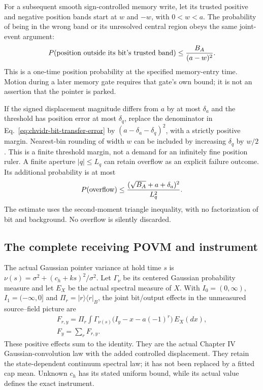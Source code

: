 For a subsequent smooth sign-controlled memory write, let its trusted
positive and negative position bands start at $w$ and $-w$, with
$0<w<a$. The probability of being in the wrong band or its unresolved
central region obeys the same joint-event argument:
\begin{equation}
 P(\hbox{position outside its bit's trusted band})
       \leq\frac{B_A}{(a-w)^2}.
 \label{eq:chvidr-trusted-band-error}
\end{equation}
This is a one-time position probability at the specified memory-entry
time. Motion during a later memory gate requires that gate's own bound;
it is not an assertion that the pointer is parked.

If the signed displacement magnitude differs from $a$ by at most
$\delta_a$ and the threshold has position error at most $\delta_q$,
replace the denominator in Eq.~\eqref{eq:chvidr-bit-transfer-error} by
$(a-\delta_a-\delta_q)^2$, with a strictly positive margin. Nearest-bin
rounding of width $w$ can be included by increasing $\delta_q$ by $w/2$.
This is a finite threshold margin, not a demand for an infinitely fine
position ruler. A finite aperture $|q|\leq L_q$ can retain overflow as
an explicit failure outcome. Its additional probability is at most
\begin{equation}
 P({\rm overflow})\leq
       \frac{(\sqrt{B_A}+a+\delta_a)^2}{L_q^2}.
 \label{eq:chvidr-pointer-aperture-tail}
\end{equation}
The estimate uses the second-moment triangle inequality, with no
factorization of bit and background. No overflow is silently discarded.

\subsection{The complete receiving POVM and instrument}
\label{sec:chvidr-complete-instrument}

The actual Gaussian pointer variance at hold time $s$ is
$\nu(s)=\sigma^2+(c_h+ks)^2/\sigma^2$. Let $\Gamma_\nu$ be its centered
Gaussian probability measure and let $E_X$ be the actual spectral measure
of $X$. With $I_0=(0,\infty)$, $I_1=(-\infty,0]$ and
$\Pi_r=|r\rangle\langle r|_B$, the joint bit/output effects in the
unmeasured source--field picture are
\begin{equation}
\begin{gathered}
F_{r,y}=\Pi_r\int
     \Gamma_{\nu(s)}\bigl(I_y-x-a(-1)^r\bigr)\,E_X(dx),
 \\
 F_y=\sum_rF_{r,y}.
\end{gathered}
\label{eq:chvidr-translated-continuum-povm}
\end{equation}
These positive effects sum to the identity. They are the actual Chapter IV
Gaussian-convolution law with the added controlled displacement. They
retain the state-dependent continuum spectral law; it has not been
replaced by a fitted cap mean. Unknown $c_h$ has its stated uniform bound,
while its actual value defines the exact instrument.

